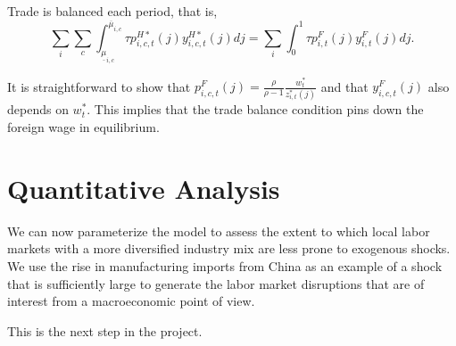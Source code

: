 \documentclass[onehalfspacing,11pt]{article}
\begin{document}
Trade is balanced each period, that is,
\begin{equation}
\sum_i \sum_c \int_{\underline{\mu}_{i,c}}^{\overline{\mu}_{i,c}} \tau p_{i,c,t}^{H*}(j)  y_{i,c,t}^{H*}(j) dj = 
\sum_i \int_0^1 \tau p_{i,t}^{F}(j) y_{i,t}^{F}(j) dj.  \label{eq:trade_balance}
\end{equation}

It is straightforward to show that $p_{i,c,t}^{F}(j)=\frac{\rho }{\rho -1}\frac{w_{t}^*}{z_{i,t}^*(j)}$ and that $y_{i,c,t}^{F}(j)$ also depends on $w_t^*$. This implies that the trade balance condition pins down the foreign wage in equilibrium.

\section{Quantitative Analysis}
We can now parameterize the model to assess the extent to which local labor markets with a more diversified industry mix are less prone to exogenous shocks. We use the rise in manufacturing imports from China as an example of a shock that is sufficiently large to generate the labor market disruptions that are of interest from a macroeconomic point of view.

{\sc This is the next step in the project.}
\end{document}
